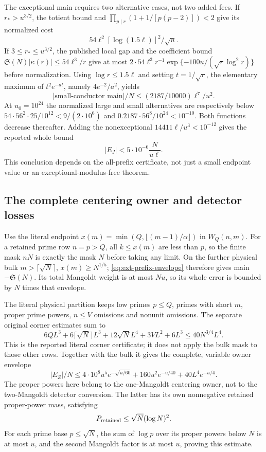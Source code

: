 \documentclass[11pt,a4paper]{article}
\theoremstyle{definition}
\theoremstyle{remark}
\begin{document}
The exceptional main requires two alternative cases, not two added
fees. If $r_*>u^{3/2}$, the totient bound and
$\prod_{p\mid r}(1+1/[p(p-2)])<2$ give its normalized cost
\[
 54\ell^2[\log(1.5\ell)]^2/\sqrt u.
\]
If $3\leq r_*\leq u^{3/2}$, the published local gap and the
coefficient bound $\mathfrak S(N)|\kappa(r)|\leq54\ell^3/r$
give at most $2\cdot54\ell^3r^{-1}
\exp\{-100u/(\sqrt r\log^2r)\}$ before normalization.
Using $\log r\leq1.5\ell$ and setting $t=1/\sqrt r$, the
elementary maximum of $t^2e^{-at}$, namely $4e^{-2}/a^2$, yields
\[
 |\text{small-conductor main}|/N
          \leq(2187/10000)\ell^7/u^2.
\]
At $u_0=10^{24}$ the normalized large and small alternatives are
respectively below
$54\cdot56^2\cdot25/10^{12}<9/(2\cdot10^6)$ and
$0.2187\cdot56^8/10^{24}<10^{-10}$.
Both functions decrease thereafter. Adding the nonexceptional
$14411\ell/u^3<10^{-12}$ gives the reported whole bound
\[
          |E_J|<5\cdot10^{-6}\frac{N}{u\ell}.
\]
This conclusion depends on the all-prefix certificate, not just a
small endpoint value or an exceptional-modulus-free theorem.

\subsection{The complete centering owner and detector losses}

Use the literal endpoint
$x(m)=\min(Q,\lfloor(m-1)/\alpha\rfloor)$ in $W_Q(n,m)$.
For a retained prime row $n=p>Q$, all $k\leq x(m)$ are less than
$p$, so the finite mask $nN$ is exactly the mask $N$ before taking
any limit. On the further physical bulk $m>\lceil\sqrt N\rceil$,
$x(m)\geq N^{1/5}$; \eqref{eq:ext-prefix-envelope} therefore gives
main $-\mathfrak S(N)$. Its total Mangoldt weight is at most $Nu$,
so its whole error is bounded by $N$ times that envelope.

The literal physical partition keeps low primes $p\leq Q$, primes
with short $m$, proper prime powers, $n\leq V$ omissions and nonunit
omissions. The separate original corner estimates sum to
\[
 6QL^3+6\lceil\sqrt N\rceil L^3+12\sqrt N L^4
                      +3VL^2+6L^3\leq40N^{3/4}L^4.
\]
This is the reported literal corner certificate; it does not apply
the bulk mask to those other rows. Together with the bulk it gives
the complete, variable owner envelope
\begin{equation}\label{eq:ext-EZ}
 |E_Z|/N\leq4\cdot10^8u^5e^{-\sqrt{u/60}}
                +160u^2e^{-u/40}+40L^4e^{-u/4}.
\end{equation}
The proper powers here belong to the one-Mangoldt centering owner,
not to the two-Mangoldt detector conversion. The latter has its own
nonnegative retained proper-power mass, satisfying
\[
 P_{\rm retained}\leq\sqrt N(\log N)^2.
\]
For each prime base $p\leq\sqrt N$, the sum of $\log p$ over its
proper powers below $N$ is at most $u$, and the second Mangoldt
factor is at most $u$, proving this estimate.
\end{document}
